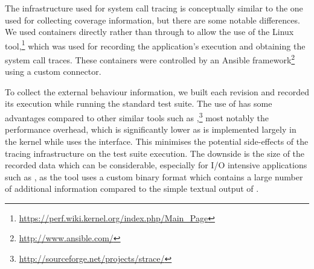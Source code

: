 
The infrastructure used for system call tracing is conceptually similar to the
one used for collecting coverage information, but there are some notable
differences. We used \lxc containers directly rather than through \docker to
allow the use of the Linux \perf
tool,\footnote{\url{https://perf.wiki.kernel.org/index.php/Main_Page}} which
was used for recording the application's execution and obtaining the system
call traces. These containers were controlled by an Ansible
framework\footnote{\url{http://www.ansible.com/}} using a custom \lxc
connector.

To collect the external behaviour information, we built each revision and
recorded its execution while running the standard test suite. The use of \perf
has some advantages compared to other similar tools such as
\strace,\footnote{\url{http://sourceforge.net/projects/strace/}} most notably
the performance overhead, which is significantly lower as \perf is implemented
largely in the kernel while \strace uses the \ptrace interface. This minimises
the potential side-effects of the tracing infrastructure on the test suite
execution.  The downside is the size of the recorded data which can be
considerable, especially for I/O intensive applications such as \redis, as the
\perf tool uses a custom binary format which contains a large number of
additional information compared to the simple textual output of \strace.



